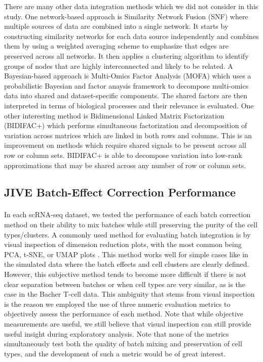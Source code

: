 \documentclass[unnumsec,webpdf,contemporary,large]{oup-authoring-template}%
\theoremstyle{thmstyleone}%
\theoremstyle{thmstyletwo}%
\theoremstyle{thmstylethree}%
\begin{document}
There are many other data integration methods which we did not consider in this study.
One network-based approach is Similarity Network Fusion \cite{wang2014similarity} (SNF) where multiple sources of data are combined into a single network. It starts by constructing similarity networks for each data source independently and combines them by using a weighted averaging scheme to emphasize that edges are preserved across all networks. It then applies a clustering algorithm to identify groups of nodes that are highly interconnected and likely to be related.
A Bayesian-based approach is Multi-Omics Factor Analysis \cite{argelaguet2018multi} (MOFA) which uses a probabilistic Bayesian and factor anaysis framework to decompose multi-omics data into shared and dataset-specific components. The shared factors are then interpreted in terms of biological processes and their relevance is evaluated.
One other interesting method is Bidimensional Linked Matrix Factorization \cite{lock2022bidimensional} (BIDIFAC+) which performs simultaneous factorization and decomposition of variation across matrices which are linked in both rows and columns. This is an improvement on methods which require shared signals to be present across all row or column sets. BIDIFAC+ is able to decompose variation into low-rank approximations that may be shared across any number of row or column sets.


\subsection{JIVE Batch-Effect Correction Performance}

\paragraph*{}
In each scRNA-seq dataset, we tested the performance of each batch correction method on their ability to mix batches while still preserving the purity of the cell types/clusters. A commonly used method for evaluating batch integration is by visual inspection of dimension reduction plots, with the most common being PCA, t-SNE, or UMAP plots \citep{tran2020benchmark}. This method works well for simple cases like in the simulated data where the batch effects and cell clusters are clearly defined. However, this subjective method tends to become more difficult if there is not clear separation between batches or when cell types are very similar, as is the case in the Bacher T-cell data. This ambiguity that stems from visual inspection is the reason we employed the use of three numeric evaluation metrics to objectively assess the performance of each method. Note that while objective measurements are useful, we still believe that visual inspection can still provide useful insight during exploratory analysis. Note that none of the metrics simultaneously test both the quality of batch mixing and preservation of cell types, and the development of such a metric would be of great interest.
\end{document}
